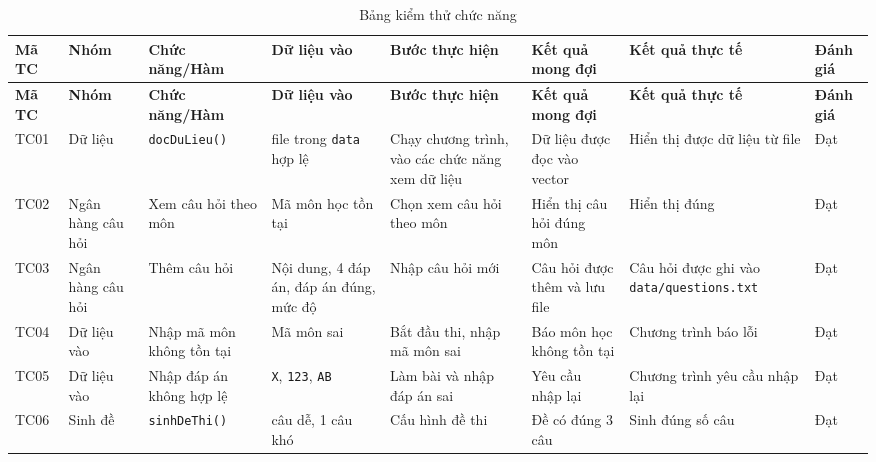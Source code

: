 \documentclass[12pt,a4paper]{report}
\begin{document}
{\scriptsize
\setlength{\tabcolsep}{2.2pt}
\renewcommand{\arraystretch}{1.25}
\begin{longtable}{|>{\centering\arraybackslash}m{}|>{\centering\arraybackslash}m{}|>{\centering\arraybackslash}m{}|>{\raggedright\arraybackslash}m{}|>{\raggedright\arraybackslash}m{}|>{\raggedright\arraybackslash}m{}|>{\raggedright\arraybackslash}m{}|>{\centering\arraybackslash}m{}|}
\caption{Bảng kiểm thử chức năng}\label{tab:kiem-thu-chuc-nang}\\
\hline
\textbf{Mã TC} & \textbf{Nhóm} & \textbf{Chức năng/Hàm} & \textbf{Dữ liệu vào} & \textbf{Bước thực hiện} & \textbf{Kết quả mong đợi} & \textbf{Kết quả thực tế} & \textbf{Đánh giá} \\
\hline
\endfirsthead
\hline
\textbf{Mã TC} & \textbf{Nhóm} & \textbf{Chức năng/Hàm} & \textbf{Dữ liệu vào} & \textbf{Bước thực hiện} & \textbf{Kết quả mong đợi} & \textbf{Kết quả thực tế} & \textbf{Đánh giá} \\
\hline
\endhead

TC01 & Dữ liệu & \texttt{docDuLieu()} & 4 file trong \texttt{data} hợp lệ & Chạy chương trình, vào các chức năng xem dữ liệu & Dữ liệu được đọc vào vector & Hiển thị được dữ liệu từ file & Đạt \\
\hline

TC02 & Ngân hàng câu hỏi & Xem câu hỏi theo môn & Mã môn học tồn tại & Chọn xem câu hỏi theo môn & Hiển thị câu hỏi đúng môn & Hiển thị đúng & Đạt \\
\hline

TC03 & Ngân hàng câu hỏi & Thêm câu hỏi & Nội dung, 4 đáp án, đáp án đúng, mức độ & Nhập câu hỏi mới & Câu hỏi được thêm và lưu file & Câu hỏi được ghi vào \texttt{data/}\allowbreak\texttt{questions.txt} & Đạt \\
\hline

TC04 & Dữ liệu vào & Nhập mã môn không tồn tại & Mã môn sai & Bắt đầu thi, nhập mã môn sai & Báo môn học không tồn tại & Chương trình báo lỗi & Đạt \\
\hline

TC05 & Dữ liệu vào & Nhập đáp án không hợp lệ & \texttt{X}, \texttt{123}, \texttt{AB} & Làm bài và nhập đáp án sai & Yêu cầu nhập lại & Chương trình yêu cầu nhập lại & Đạt \\
\hline

TC06 & Sinh đề & \texttt{sinhDeThi()} & 2 câu dễ, 1 câu khó & Cấu hình đề thi & Đề có đúng 3 câu & Sinh đúng số câu & Đạt \\
\hline


\end{longtable}}
\end{document}
